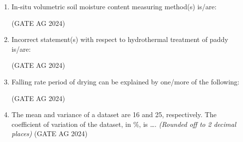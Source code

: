 \documentclass[journal]{IEEEtran}
\begin{document}
\begin{enumerate}
     \medskip

\item
In-situ volumetric soil moisture content measuring method(s) is/are:
    \begin{enumerate}
    \end{enumerate}
     \hfill(GATE AG 2024)\\

     \medskip

\item
Incorrect statement(s) with respect to hydrothermal treatment of paddy is/are:
    \begin{enumerate}
    \end{enumerate}
     \hfill(GATE AG 2024)\\

     \medskip

\item
Falling rate period of drying can be explained by one/more of the following:
    \begin{enumerate}
    \end{enumerate}
     \hfill(GATE AG 2024)\\

     \medskip

\item
The mean and variance of a dataset are 16 and 25, respectively. The coefficient of variation of the dataset, in \%, is \dots. \textit{(Rounded off to 2 decimal places)}
 \hfill(GATE AG 2024)\\


\end{enumerate}
\end{document}
